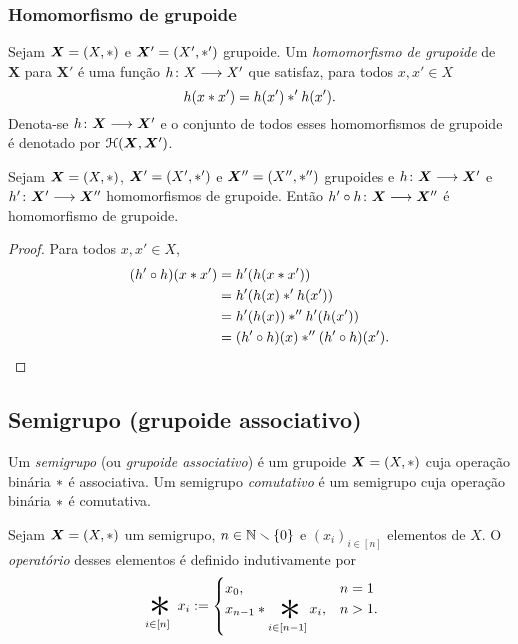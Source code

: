 \subsubsection{Homomorfismo de grupoide}

\begin{definition}
Sejam $\bm X=(X,\ast)$ e $\bm X'=(X',\ast')$ grupoide. Um \emph{homomorfismo de grupoide} de $\bm X$ para $\bm X'$ é uma função ${h}\colon {X} \longrightarrow {X'}$ que satisfaz, para todos $x,x' \in X$
	\begin{equation*}
	h(x \ast x')=h(x') \ast' h(x').
	\end{equation*}
Denota-se ${h}\colon {\bm X} \longrightarrow {\bm X'}$ e o conjunto de todos esses homomorfismos de grupoide é denotado por $\mathcal{H}(\bm X,\bm X')$.
\end{definition}

\begin{proposition}
\label{comp.hom.grupoide}
Sejam $\bm X=(X,\ast)$, $\bm X'=(X',\ast')$ e $\bm X''=(X'',\ast'')$ grupoides e ${h}\colon {\bm X } \longrightarrow {\bm X'}$ e ${h'}\colon {\bm X'} \longrightarrow {\bm X''}$ homomorfismos de grupoide. Então ${h' \circ h}\colon {\bm X} \longrightarrow {\bm X''}$ é homomorfismo de grupoide.
\end{proposition}
\begin{proof}
Para todos $x,x' \in X$,
	\begin{align*}
	(h' \circ h)(x \ast x') &= h'(h(x \ast x')) \\
		&= h'(h(x) \ast' h(x')) \\
		&= h'(h (x)) \ast'' h'(h(x')) \\
		&= (h' \circ h)(x) \ast'' (h' \circ h)(x').
		\qedhere
	\end{align*}
\end{proof}

\subsection{Semigrupo (grupoide associativo)}

\begin{definition}
Um \emph{semigrupo} (ou \emph{grupoide associativo}) é um grupoide $\bm X=(X,\ast)$ cuja operação binária $\ast$ é associativa. Um semigrupo \emph{comutativo} é um semigrupo cuja operação binária $\ast$ é comutativa.
\end{definition}

\begin{definition}
Sejam $\bm X=(X,\ast)$ um semigrupo, $n \in \mathbb{N} \smallsetminus \{0\}$ e $(x_i)_{i \in [n]}$ elementos de $X$. O \emph{operatório} desses elementos é definido indutivamente por
	\begin{equation*}
	\bigopb _{i \in [n]} x_i :=
		\begin{cases}
		x_0, & n=1\\
		x_{n-1} \opb \displaystyle \bigopb_{i \in [n-1]} x_i, & n>1.
		\end{cases}
	\end{equation*}
\end{definition}

